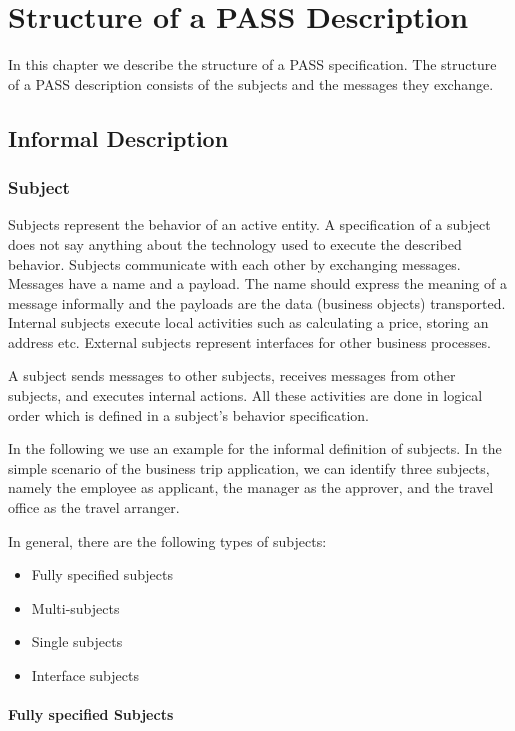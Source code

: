 \chapter{Structure of a PASS Description}
\label{PASSStruct}

In this chapter we describe the structure of a PASS specification. The structure of a PASS description consists of the subjects and the messages they exchange.

\section{Informal Description}
\subsection{Subject}
\label{sec: Subject}

Subjects represent the behavior of an active entity. A specification of a subject does not say anything about the technology used to execute the described behavior. Subjects communicate with each other by exchanging messages. Messages have a name and a payload. The name should express the meaning of a message informally and the payloads are the data (business objects) transported. Internal subjects execute local activities such as calculating a price, storing an address etc. External subjects represent interfaces for other business processes.

A subject sends messages to other subjects, receives messages from other subjects, and executes internal actions. All these activities are done in logical order which is defined in a subject's behavior specification.

In the following we use an example for the informal definition of subjects. In the simple scenario of the business trip application, we can identify three subjects, namely the employee as applicant, the manager as the approver, and the travel office as the travel arranger.

In general, there are the following types of subjects:

\begin{itemize}
	\item Fully specified subjects
	\item Multi-subjects
	\item Single subjects
	\item Interface subjects 
\end{itemize}

\subsubsection{Fully specified Subjects}

